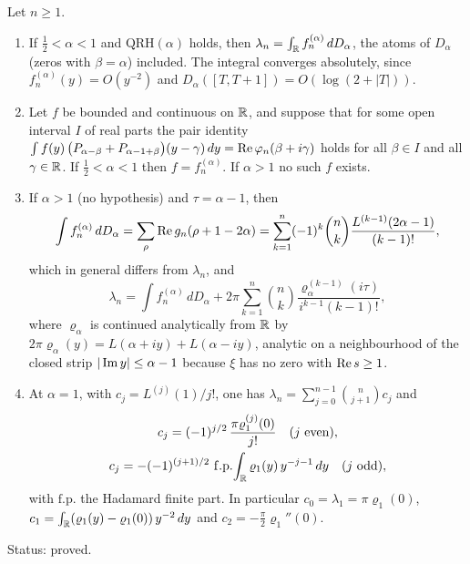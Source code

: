 \begin{theorem}\label{iw:thm:li}
Let $n\ge1$.
\begin{enumerate}
\item[(a)] If $\frac12<\alpha<1$ and $\mathrm{QRH}(\alpha)$ holds, then $\lambda_n=\int_{\mathbb{R}}f_n^{(\alpha)}\,dD_\alpha$, the atoms of $D_\alpha$ (zeros with $\beta=\alpha$) included. The integral converges absolutely, since $f_n^{(\alpha)}(y)=O(y^{-2})$ and $D_\alpha([T,T+1])=O(\log(2+|T|))$.
\item[(b)] Let $f$ be bounded and continuous on $\mathbb{R}$, and suppose that for some open interval $I$ of real parts the pair identity $\int f(y)\,\big(P_{\alpha-\beta}+P_{\alpha-1+\beta}\big)(y-\gamma)\,dy=\operatorname{Re}\varphi_n(\beta+i\gamma)$ holds for all $\beta\in I$ and all $\gamma\in\mathbb{R}$. If $\frac12<\alpha<1$ then $f=f_n^{(\alpha)}$. If $\alpha>1$ no such $f$ exists.
\item[(c)] If $\alpha>1$ (no hypothesis) and $\tau=\alpha-1$, then
\[
\int f_n^{(\alpha)}\,dD_\alpha=\sum_\rho\operatorname{Re} g_n(\rho+1-2\alpha)=\sum_{k=1}^n(-1)^k\binom nk\frac{L^{(k-1)}(2\alpha-1)}{(k-1)!},
\]
which in general differs from $\lambda_n$, and
\[
\lambda_n=\int f_n^{(\alpha)}\,dD_\alpha+2\pi\sum_{k=1}^n\binom nk\frac{\varrho_\alpha^{(k-1)}(i\tau)}{i^{k-1}(k-1)!},
\]
where $\varrho_\alpha$ is continued analytically from $\mathbb{R}$ by $2\pi\varrho_\alpha(y)=L(\alpha+iy)+L(\alpha-iy)$, analytic on a neighbourhood of the closed strip $|\operatorname{Im} y|\le\alpha-1$ because $\xi$ has no zero with $\operatorname{Re} s\ge1$.
\item[(d)] At $\alpha=1$, with $c_j=L^{(j)}(1)/j!$, one has $\lambda_n=\sum_{j=0}^{n-1}\binom n{j+1}c_j$ and
\begin{gather*}
c_j=(-1)^{j/2}\,\frac{\pi\varrho_1^{(j)}(0)}{j!}\quad(j\text{ even}),\\
c_j=-(-1)^{(j+1)/2}\ \mathrm{f.p.}\!\int_{\R}\varrho_1(y)\,y^{-j-1}\,dy\quad(j\text{ odd}),
\end{gather*}
with $\mathrm{f.p.}$ the Hadamard finite part. In particular $c_0=\lambda_1=\pi\varrho_1(0)$, $c_1=\int_{\mathbb{R}}(\varrho_1(y)-\varrho_1(0))\,y^{-2}\,dy$ and $c_2=-\frac\pi2\varrho_1''(0)$.
\end{enumerate}
Status: proved.
\end{theorem}


